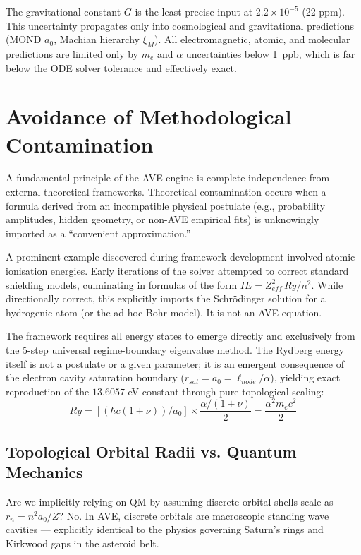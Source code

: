 The gravitational constant $G$ is the least precise input at $2.2 \times 10^{-5}$ (22 ppm).  This uncertainty propagates only into cosmological and gravitational predictions (MOND $a_0$, Machian hierarchy $\xi_M$).  All electromagnetic, atomic, and molecular predictions are limited only by $m_e$ and $\alpha$ uncertainties below 1~ppb, which is far below the ODE solver tolerance and effectively exact.

\section{Avoidance of Methodological Contamination}
\label{sec:methodological_contamination}

A fundamental principle of the AVE engine is complete independence from external theoretical frameworks. Theoretical contamination occurs when a formula derived from an incompatible physical postulate (e.g., probability amplitudes, hidden geometry, or non-AVE empirical fits) is unknowingly imported as a ``convenient approximation.''

A prominent example discovered during framework development involved atomic ionisation energies. Early iterations of the solver attempted to correct standard shielding models, culminating in formulas of the form $IE = Z_{eff}^2 \, Ry / n^2$. While directionally correct, this explicitly imports the Schrödinger solution for a hydrogenic atom (or the ad-hoc Bohr model). It is not an AVE equation.

The framework requires all energy states to emerge directly and exclusively from the 5-step universal regime-boundary eigenvalue method. The Rydberg energy itself is not a postulate or a given parameter; it is an emergent consequence of the electron cavity saturation boundary ($r_{sat} = a_0 = \ell_{node}/\alpha$), yielding exact reproduction of the $13.6057$ eV constant through pure topological scaling:
\begin{equation}
    Ry = \left[ (\hbar c(1+\nu)) / a_0 \right] \times \frac{\alpha/(1+\nu)}{2} = \frac{\alpha^2 m_e c^2}{2}
\end{equation}

\subsection{Topological Orbital Radii vs. Quantum Mechanics}
Are we implicitly relying on QM by assuming discrete orbital shells scale as $r_n = n^2 a_0 / Z$? No. In AVE, discrete orbitals are macroscopic standing wave cavities — explicitly identical to the physics governing Saturn's rings and Kirkwood gaps in the asteroid belt. 

